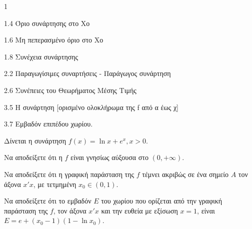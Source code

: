 \begin{ylh}{1}
    \item 1.4 Όριο συνάρτησης στο Χο
    \item 1.6 Μη πεπερασμένο όριο στο Χο
    \item 1.8 Συνέχεια συνάρτησης
    \item 2.2 Παραγωγίσιμες συναρτήσεις - Παράγωγος συνάρτηση
    \item 2.6 Συνέπειες του Θεωρήματος Μέσης Τιμής
    \item 3.5 Η συνάρτηση [ορισμένο ολοκλήρωμα της f από α έως χ]
    \item 3.7 Εμβαδόν επιπέδου χωρίου.
\end{ylh}
Δίνεται η συνάρτηση $f(x) = \ln x + e^x, x > 0.$
\begin{alist}
\item Να αποδείξετε ότι η $f$ είναι γνησίως αύξουσα στο $(0, +\infty).$ 
\item Να αποδείξετε ότι η γραφική παράσταση της $f$ τέμνει ακριβώς σε ένα σημείο $Α$ τον άξονα $x'x$, με τετμημένη $x_0 \in (0,1).$ 
\item Να αποδείξετε ότι το εμβαδόν $E$ του χωρίου που ορίζεται από την γραφική παράσταση της $f$, τον άξονα $x'x$ και την ευθεία με εξίσωση $x = 1$, είναι $E = e + (x_0 - 1)(1 - \ln x_0).$ 
\end{alist}